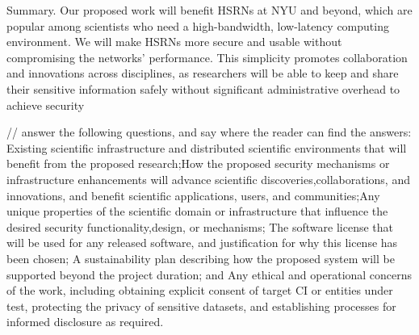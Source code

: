 Summary. Our proposed work will benefit HSRNs at NYU and beyond, which are popular among scientists who need a high-bandwidth, low-latency computing environment. We will make HSRNs more secure and usable without compromising the networks' performance. This simplicity promotes collaboration and innovations across disciplines, as researchers will be able to keep and share their sensitive information safely without significant administrative overhead to achieve security

// answer the following questions, and say where the reader can find the answers: Existing scientific infrastructure and distributed scientific environments that will benefit from the proposed research;How the proposed security mechanisms or infrastructure enhancements will advance scientific discoveries,collaborations, and innovations, and benefit scientific applications, users, and communities;Any unique properties of the scientific domain or infrastructure that influence the desired security functionality,design, or mechanisms; The software license that will be used for any released software, and justification for why this license has been chosen; A sustainability plan describing how the proposed system will be supported beyond the project duration; and Any ethical and operational concerns of the work, including obtaining explicit consent of target CI or entities under test, protecting the privacy of sensitive datasets, and establishing processes for informed disclosure as required.

